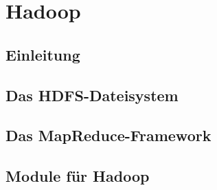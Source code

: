 \section{Hadoop}
\cite{Wartal2012}
\cite{Endlich2011}
\subsection{Einleitung}
\subsection{Das HDFS-Dateisystem}
\subsection{Das MapReduce-Framework}
\subsection{Module für Hadoop}